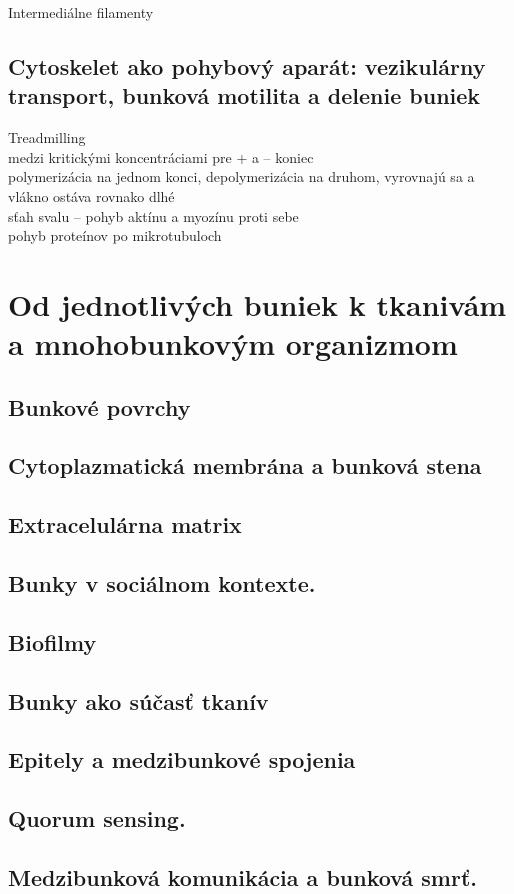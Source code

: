 Intermediálne filamenty\\
\subsection{Cytoskelet ako pohybový aparát: vezikulárny transport, bunková motilita a delenie buniek}
Treadmilling\\
\tab medzi kritickými koncentráciami pre + a -- koniec\\
\tab polymerizácia na jednom konci, depolymerizácia na druhom, vyrovnajú sa a vlákno ostáva rovnako dlhé\\
sťah svalu -- pohyb aktínu a myozínu proti sebe\\
pohyb proteínov po mikrotubuloch\\

\section{Od jednotlivých buniek k tkanivám a mnohobunkovým organizmom}

\subsection{Bunkové povrchy}

\subsection{Cytoplazmatická membrána a bunková stena}

\subsection{Extracelulárna matrix}

\subsection{Bunky v sociálnom kontexte.}

\subsection{Biofilmy}

\subsection{Bunky ako súčasť tkanív}

\subsection{Epitely a medzibunkové spojenia}

\subsection{Quorum sensing.}

\subsection{Medzibunková komunikácia a bunková smrť.}
